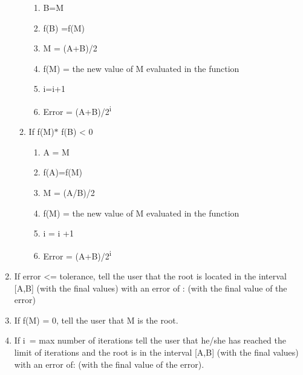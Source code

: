 \documentclass[12pt]{article}
\renewcommand{\_}{\kern-1.5pt\textunderscore\kern-1.5pt}
\begin{document}
\begin{enumerate}
\begin{enumerate}
\begin{enumerate}
	\item B=M\par

	\item f(B) =f(M)\par

	\item M = (A+B)/2\par

	\item f(M) = the new value of M evaluated in the function\par

	\item i=i+1\par

	\item Error = (A+B)/2\textsuperscript{i}\par


\end{enumerate}
	\item If f(M)$\ast$ f(B) < 0\par

\begin{enumerate}
	\item A = M\par

	\item f(A)=f(M)\par

	\item M = (A/B)/2\par

	\item f(M) = the new value of M evaluated in the function\par

	\item i = i +1\par

	\item Error = (A+B)/2\textsuperscript{i }\par


\end{enumerate}
\end{enumerate}
	\item If error <= tolerance, tell the user that the root is located in the interval [A,B] (with the final values) with an error of : \_\_\_(with the final value of the error)\par

	\item If f(M) = 0, tell the user that M is the root.\par

	\item If i\ = max number of iterations tell the user that he/she has reached the limit of iterations and the root is in the interval [A,B] (with the final values) with an error of: \_\_\_(with the final value of the error).  
\end{enumerate}\par


\vspace{\baselineskip}

\printbibliography
\end{document}
